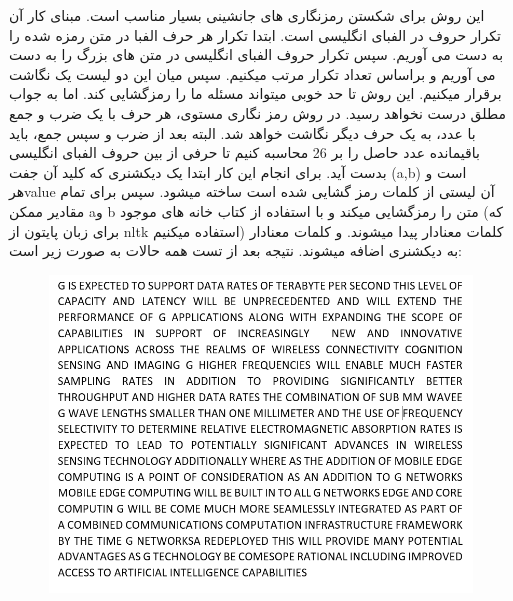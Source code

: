 این روش برای شکستن رمزنگاری های جانشینی بسیار مناسب است. مبنای کار آن تکرار حروف در الفبای انگلیسی است. ابتدا تکرار هر حرف الفبا در متن رمزه شده را به دست می آوریم. سپس تکرار حروف الفبای انگلیسی در متن های بزرگ را به دست می آوریم و براساس تعداد تکرار مرتب میکنیم. سپس میان این دو لیست یک نگاشت برقرار میکنیم.
این روش تا حد خوبی میتواند مسئله ما را رمزگشایی کند. اما به جواب مطلق درست نخواهد رسید.
در روش رمز نگاری مستوی، هر حرف با یک ضرب و جمع با عدد، به یک حرف دیگر نگاشت خواهد شد. البته بعد از ضرب و سپس جمع، باید باقیمانده عدد حاصل را بر 26 محاسبه کنیم تا حرفی از بین حروف الفبای انگلیسی بدست آید.
برای انجام این کار ابتدا یک دیکشنری که کلید آن جفت (a,b) است و هرvalue آن لیستی از کلمات رمز گشایی شده است ساخته میشود. سپس برای تمام مقادیر ممکن aو b متن را رمزگشایی میکند و با استفاده از کتاب خانه های موجود (که برای زبان پایتون از nltk استفاده میکنیم) کلمات معنادار پیدا میشوند. و کلمات معنادار به دیکشنری اضافه میشوند.
نتیجه بعد از تست همه حالات به صورت زیر است:
\begin{figure}[ht!]
    \centering
    \includegraphics[width=1.1\linewidth]{images/text.png}
  
    \label{fig:dynamicprogramming}
\end{figure}
